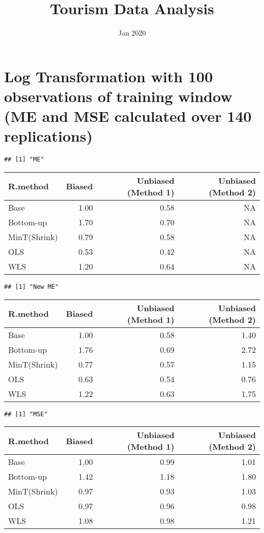 \documentclass[
]{article}
\title{Tourism Data Analysis}
\author{}
\date{\vspace{-2.5em}Jan 2020}
\begin{document}
\maketitle

\hypertarget{log-transformation-with-100-observations-of-training-window-me-and-mse-calculated-over-140-replications}{%
\section{Log Transformation with 100 observations of training window (ME
and MSE calculated over 140
replications)}\label{log-transformation-with-100-observations-of-training-window-me-and-mse-calculated-over-140-replications}}

\begin{verbatim}
## [1] "ME"
\end{verbatim}

\begin{tabular}{l|r|r|r}
\hline
R.method & Biased & Unbiased (Method 1) & Unbiased (Method 2)\\
\hline
Base & 1.00 & 0.58 & NA\\
\hline
Bottom-up & 1.70 & 0.70 & NA\\
\hline
MinT(Shrink) & 0.79 & 0.58 & NA\\
\hline
OLS & 0.53 & 0.42 & NA\\
\hline
WLS & 1.20 & 0.64 & NA\\
\hline
\end{tabular}

\begin{verbatim}
## [1] "New ME"
\end{verbatim}

\begin{tabular}{l|r|r|r}
\hline
R.method & Biased & Unbiased (Method 1) & Unbiased (Method 2)\\
\hline
Base & 1.00 & 0.58 & 1.40\\
\hline
Bottom-up & 1.76 & 0.69 & 2.72\\
\hline
MinT(Shrink) & 0.77 & 0.57 & 1.15\\
\hline
OLS & 0.63 & 0.54 & 0.76\\
\hline
WLS & 1.22 & 0.63 & 1.75\\
\hline
\end{tabular}

\begin{verbatim}
## [1] "MSE"
\end{verbatim}

\begin{tabular}{l|r|r|r}
\hline
R.method & Biased & Unbiased (Method 1) & Unbiased (Method 2)\\
\hline
Base & 1.00 & 0.99 & 1.01\\
\hline
Bottom-up & 1.42 & 1.18 & 1.80\\
\hline
MinT(Shrink) & 0.97 & 0.93 & 1.03\\
\hline
OLS & 0.97 & 0.96 & 0.98\\
\hline
WLS & 1.08 & 0.98 & 1.21\\
\hline
\end{tabular}
\end{document}
